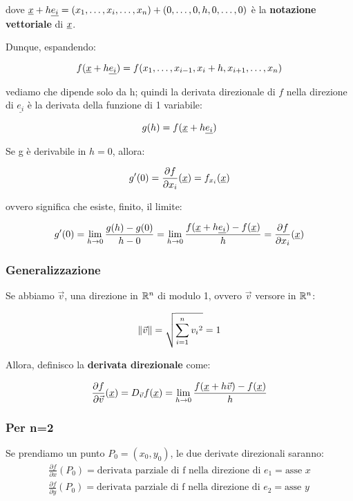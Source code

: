 dove \(\underline{x} + h \underline{e_i} = (x_1, \ldots, x_i, \ldots, x_n) + (0,\ldots,0,h,0,\ldots,0)\) è la \textbf{notazione vettoriale} di \(\underline{x} \).

Dunque, espandendo:

\[
    f( \underline{x} +h \underline{e_i} ) = f( x_{1}, \ldots , x_{i-1},x_{i}+h , x_{i+1}, \ldots ,x_{n})
\]

vediamo che dipende solo da h; quindi la derivata direzionale di \(f\) nella direzione di \(\underline{e_i}\) è la derivata della funzione di 1 variabile:

\[
    g(h) = f(\underline{x} + h \underline{e_i} )
\]

Se g è derivabile in \(h=0\), allora:

\[
    g'(0) = \frac{\partial f}{\partial x_i}(\underline{x} ) = f_{x_i}(\underline{x})
\]

ovvero significa che esiste, finito, il limite:

\[
    g'(0) = \lim_{ h \to 0 } \frac{g(h) - g(0)}{h-0} = \lim_{ h \to 0 } \frac{f(\underline{x} +h \underline{e_i} ) - f(\underline{x} )}{h} = \frac{\partial f}{\partial x_i}(\underline{x})
\]

\subsubsection*{Generalizzazione}

Se abbiamo \(\vec{v} \), una direzione in \(\mathbb{R}^{n} \) di modulo 1, ovvero \(\vec{v}\) versore in \(\mathbb{R}^{n} \):

\[
    \left\lVert\vec{v}\right\rVert = \sqrt{\sum^{n}_{i=1} {v_i}^{2}} = 1
\]

Allora, definisco la \textbf{derivata direzionale} come:

\[
    \frac{\partial f}{\partial \vec{v}}(\underline{x}) = D_{\vec{v}} f(\underline{x} ) = \lim_{ h \to 0 } \frac{f(\underline{x} +h \vec{v} ) -f(\underline{x} )}{h}
\]

\filbreak{}
\subsubsection*{Per n=2}

Se prendiamo un punto \(P_0 = (x_0, y_0)\), le due derivate direzionali saranno:
\begin{align*}
    \frac{\partial f}{\partial x}(P_0) = \text{derivata parziale di f nella direzione di } e_1 = \text{asse } x \\[3mm]
    \frac{\partial f}{\partial y}(P_0) = \text{derivata parziale di f nella direzione di } e_2 = \text{asse } y
\end{align*}

